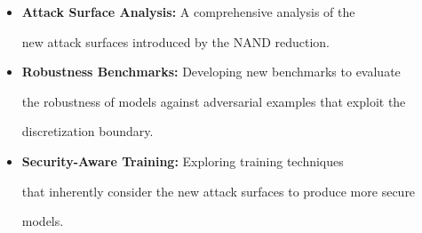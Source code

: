 \begin{itemize}






    \item \textbf{Attack Surface Analysis:} A comprehensive analysis of the






    new attack surfaces introduced by the NAND reduction.






    






    \item \textbf{Robustness Benchmarks:} Developing new benchmarks to evaluate






    the robustness of models against adversarial examples that exploit the






    discretization boundary.






    






    \item \textbf{Security-Aware Training:} Exploring training techniques






    that inherently consider the new attack surfaces to produce more secure






    models.






\end{itemize}



















